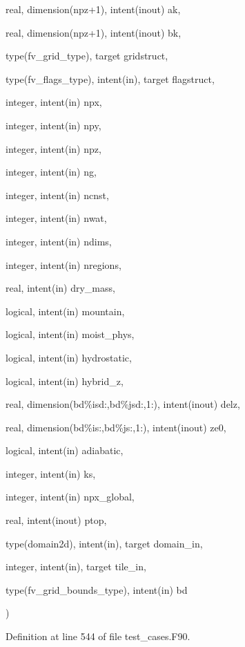 {\begin{DoxyParamCaption}
\item[{real, dimension(npz+1), intent(inout)}]{ak, }
\item[{real, dimension(npz+1), intent(inout)}]{bk, }
\item[{type(fv\-\_\-grid\-\_\-type), target}]{gridstruct, }
\item[{type(fv\-\_\-flags\-\_\-type), intent(in), target}]{flagstruct, }
\item[{integer, intent(in)}]{npx, }
\item[{integer, intent(in)}]{npy, }
\item[{integer, intent(in)}]{npz, }
\item[{integer, intent(in)}]{ng, }
\item[{integer, intent(in)}]{ncnst, }
\item[{integer, intent(in)}]{nwat, }
\item[{integer, intent(in)}]{ndims, }
\item[{integer, intent(in)}]{nregions, }
\item[{real, intent(in)}]{dry\-\_\-mass, }
\item[{logical, intent(in)}]{mountain, }
\item[{logical, intent(in)}]{moist\-\_\-phys, }
\item[{logical, intent(in)}]{hydrostatic, }
\item[{logical, intent(in)}]{hybrid\-\_\-z, }
\item[{real, dimension(bd\%isd\-:,bd\%jsd\-:,1\-:), intent(inout)}]{delz, }
\item[{real, dimension(bd\%is\-:,bd\%js\-:,1\-:), intent(inout)}]{ze0, }
\item[{logical, intent(in)}]{adiabatic, }
\item[{integer, intent(in)}]{ks, }
\item[{integer, intent(in)}]{npx\-\_\-global, }
\item[{real, intent(inout)}]{ptop, }
\item[{type(domain2d), intent(in), target}]{domain\-\_\-in, }
\item[{integer, intent(in), target}]{tile\-\_\-in, }
\item[{type(fv\-\_\-grid\-\_\-bounds\-\_\-type), intent(in)}]{bd}
\end{DoxyParamCaption}
)}\label{classtest__cases__mod_a986f9f679bcd73e158def56cd9848054}


Definition at line 544 of file test\-\_\-cases.\-F90.



